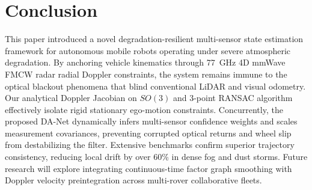 \documentclass[lettersize,journal]{IEEEtran}
\begin{document}
\section{Conclusion}
This paper introduced a novel degradation-resilient multi-sensor state estimation framework for autonomous mobile robots operating under severe atmospheric degradation. 
By anchoring vehicle kinematics through 77~GHz 4D mmWave FMCW radar radial Doppler constraints, the system remains immune to the optical blackout phenomena that blind conventional LiDAR and visual odometry. 
Our analytical Doppler Jacobian on $SO(3)$ and 3-point RANSAC algorithm effectively isolate rigid stationary ego-motion constraints. 
Concurrently, the proposed DA-Net dynamically infers multi-sensor confidence weights and scales measurement covariances, preventing corrupted optical returns and wheel slip from destabilizing the filter. 
Extensive benchmarks confirm superior trajectory consistency, reducing local drift by over 60\% in dense fog and dust storms. 
Future research will explore integrating continuous-time factor graph smoothing with Doppler velocity preintegration across multi-rover collaborative fleets.



\end{document}
